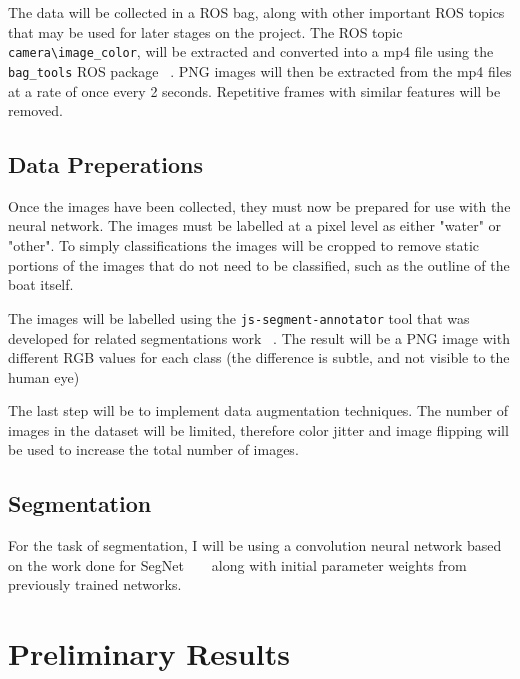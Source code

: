 \documentclass[10pt,twocolumn,letterpaper]{article}
\begin{document}
The data will be collected in a ROS bag, along with other important ROS topics that may be used
for later stages on the project. The ROS topic \verb|camera\image_color|, will be extracted and 
converted into a mp4 file using the \verb|bag_tools| ROS package ~\cite{bagtools}. PNG images
will then be extracted from the mp4 files at a rate of once every 2 seconds. Repetitive frames
with similar features will be removed.

\subsection{Data Preperations}
Once the images have been collected, they must now be prepared for use with the neural network.
The images must be labelled at a pixel level as either "water" or "other". To simply classifications
the images will be cropped to remove static portions of the images that do not need to be classified,
such as the outline of the boat itself.

The images will be labelled using the \verb|js-segment-annotator| tool that was developed for related
segmentations work ~\cite{tangseng2017looking}. The result will be a PNG image with different 
RGB values for each class (the difference is subtle, and not visible to the human eye)

The last step will be to implement data augmentation techniques. The number of images in the 
dataset will be limited, therefore color jitter and image flipping will be used to increase the total 
number of images.

\subsection{Segmentation}
For the task of segmentation, I will be using a convolution neural network based on the work
done for SegNet ~\cite{DBLP:journals/corr/KendallBC15} ~\cite{DBLP:journals/corr/BadrinarayananK15}
along with initial parameter weights from previously trained networks.


\section{Preliminary Results}
\end{document}

